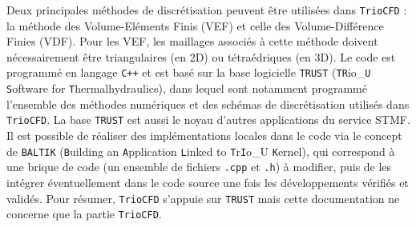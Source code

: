 Deux principales m\'ethodes de discr\'etisation peuvent \^etre utilis\'ees
dans \texttt{TrioCFD} : la m\'ethode des Volume-El\'ements Finis (VEF)
et celle des Volume-Diff\'erence Finies (VDF). Pour les VEF, les maillages
associ\'es \`a cette m\'ethode doivent n\'ecessairement \^etre triangulaires
(en 2D) ou t\'etra\'edriques (en 3D). Le code est programm\'e en langage
\texttt{C++} et est bas\'e sur la base logicielle \texttt{TRUST} (\texttt{TR}io\_\texttt{U}
\texttt{S}oftware for \texttt{T}hermalhydraulics), dans lequel sont
notamment programm\'e l\textquoteright ensemble des m\'ethodes num\'eriques
et des sch\'emas de discr\'etisation utilis\'es dans \texttt{TrioCFD}. La
base \texttt{TRUST} est aussi le noyau d'autres applications du service
STMF. Il est possible de r\'ealiser des impl\'ementations locales dans
le code via le concept de \texttt{BALTIK} (\texttt{B}uilding an \texttt{A}pplication
\texttt{L}inked to \texttt{T}r\texttt{I}o\_U \texttt{K}ernel), qui
correspond \`a une brique de code (un ensemble de fichiers \texttt{.cpp}
et \texttt{.h}) \`a modifier, puis de les int\'egrer \'eventuellement dans
le code source une fois les d\'eveloppements v\'erifi\'es et valid\'es. Pour
r\'esumer, \texttt{TrioCFD} s'appuie sur \texttt{TRUST} mais cette documentation
ne concerne que la partie \texttt{TrioCFD}.

